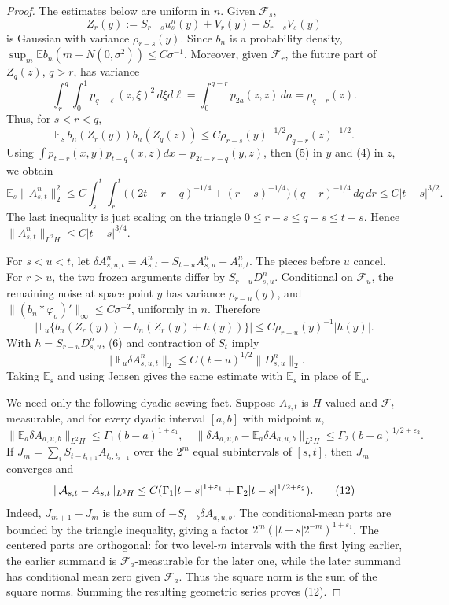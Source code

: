 \documentclass[12pt]{article}
\newcommand{\E}{\mathbb E}
\newcommand{\1}{\mathbf 1}
\newcommand{\calF}{\mathcal F}
\begin{document}
\begin{proof}
The estimates below are uniform in \(n\).  Given \(\calF_s\),
\[
Z_r(y):=S_{r-s}u_s^n(y)+V_r(y)-S_{r-s}V_s(y)
\]
is Gaussian with variance \(\rho_{r-s}(y)\).  Since \(b_n\) is a probability
density, \(\sup_m\E b_n(m+N(0,\sigma^2))\le C\sigma^{-1}\).  Moreover, given
\(\calF_r\), the future part of \(Z_q(z)\), \(q>r\), has variance
\[
 \int_r^q\!\!\int_0^1p_{q-\ell}(z,\xi)^2\,d\xi d\ell
 =\int_0^{q-r}p_{2a}(z,z)\,da=\rho_{q-r}(z).
\]
Thus, for \(s<r<q\),
\[
 \E_s\,b_n(Z_r(y))b_n(Z_q(z))
 \le C\rho_{r-s}(y)^{-1/2}\rho_{q-r}(z)^{-1/2}.              \tag{9}
\]
Using
\(\int p_{t-r}(x,y)p_{t-q}(x,z)dx=p_{2t-r-q}(y,z)\), then (5) in \(y\) and
(4) in \(z\), we obtain
\[
 \E_s\|A^n_{s,t}\|_2^2
 \le C\!\int_s^t\!\!\int_r^t
      \bigl((2t-r-q)^{-1/4}+(r-s)^{-1/4}\bigr)(q-r)^{-1/4}\,dq\,dr
 \le C|t-s|^{3/2}.                                          \tag{10}
\]
The last inequality is just scaling on the triangle
\(0\le r-s\le q-s\le t-s\).  Hence
\(\|A^n_{s,t}\|_{L^2H}\le C|t-s|^{3/4}\).

For \(s<u<t\), let
\(\delta A^n_{s,u,t}=A^n_{s,t}-S_{t-u}A^n_{s,u}-A^n_{u,t}\).  The pieces before
\(u\) cancel.  For \(r>u\), the two frozen arguments differ by
\(S_{r-u}D^n_{s,u}\).  Conditional on \(\calF_u\), the remaining noise at
space point \(y\) has variance \(\rho_{r-u}(y)\), and
\(\|(b_n*\varphi_\sigma)'\|_\infty\le C\sigma^{-2}\), uniformly in \(n\).
Therefore
\[
 \left|\E_u\{b_n(Z_r(y))-b_n(Z_r(y)+h(y))\}\right|
      \le C\rho_{r-u}(y)^{-1}|h(y)|.
\]
With \(h=S_{r-u}D^n_{s,u}\), (6) and contraction of \(S_t\) imply
\[
        \|\E_u\delta A^n_{s,u,t}\|_2
        \le C(t-u)^{1/2}\|D^n_{s,u}\|_2 .                    \tag{11}
\]
Taking \(\E_s\) and using Jensen gives the same estimate with \(\E_s\) in
place of \(\E_u\).

We need only the following dyadic sewing fact.  Suppose \(A_{s,t}\) is
\(H\)-valued and \(\calF_t\)-measurable, and for every dyadic interval
\([a,b]\) with midpoint \(u\),
\[
\|\E_a\delta A_{a,u,b}\|_{L^2H}\le \Gamma_1(b-a)^{1+\varepsilon_1},\quad
\|\delta A_{a,u,b}-\E_a\delta A_{a,u,b}\|_{L^2H}
        \le \Gamma_2(b-a)^{1/2+\varepsilon_2}.
\]
If \(J_m=\sum_iS_{t-t_{i+1}}A_{t_i,t_{i+1}}\) over the \(2^m\) equal
subintervals of \([s,t]\), then \(J_m\) converges and
\[
 \|{\cal A}_{s,t}-A_{s,t}\|_{L^2H}
 \le C(\Gamma_1|t-s|^{1+\varepsilon_1}
       +\Gamma_2|t-s|^{1/2+\varepsilon_2}).                 \tag{12}
\]
Indeed, \(J_{m+1}-J_m\) is the sum of
\(-S_{t-b}\delta A_{a,u,b}\).  The conditional-mean parts are bounded by the
triangle inequality, giving a factor
\(2^m(|t-s|2^{-m})^{1+\varepsilon_1}\).  The centered parts are orthogonal:
for two level-\(m\) intervals with the first lying earlier, the earlier
summand is \(\calF_a\)-measurable for the later one, while the later summand
has conditional mean zero given \(\calF_a\).  Thus the square norm is the sum
of the square norms.  Summing the resulting geometric series proves (12).


\end{proof}
\end{document}
